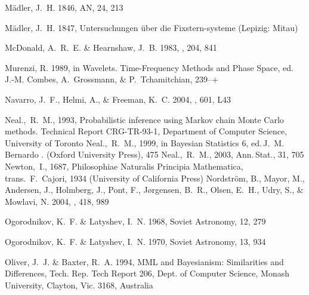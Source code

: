 \begin{thebibliography}{99}
{M{\"a}dler}, J.~H. 1846, AN, 24, 213

{M{\"a}dler}, J.~H. 1847, {Untersuchungen {\"u}ber die Fixstern-systeme}
  (Lepizig: Mitau)

{McDonald}, A.~R.~E. \& {Hearnshaw}, J.~B. 1983, \mnras, 204, 841

{Murenzi}, R. 1989, in Wavelets. Time-Frequency Methods and Phase Space, ed.
  J.-M. {Combes}, A.~{Grossmann}, \& P.~{Tchamitchian}, 239--+

{Navarro}, J.~F., {Helmi}, A., \& {Freeman}, K.~C. 2004, \apjl, 601, L43

  Neal.,~R.~M., 1993,
  Probabilistic inference using {M}arkov chain {M}onte {C}arlo methods.
  Technical Report CRG-TR-93-1, Department of Computer Science,
  University of Toronto
  Neal.,~R.~M., 1999,
  in Bayesian Statistics 6,
  ed.\,J.~M. Bernardo \etal. (Oxford University Press), 475
  Neal.,~R.~M., 2003,
  Ann.\,Stat., 31, 705
  Newton,~I., 1687,
  Philosophiae Naturalis Principia Mathematica,
  trans.\ F.~Cajori, 1934
  (University of California Press)
{Nordstr{\"o}m}, B., {Mayor}, M., {Andersen}, J., {Holmberg}, J., {Pont}, F.,
  {J{\o}rgensen}, B.~R., {Olsen}, E.~H., {Udry}, S., \& {Mowlavi}, N. 2004,
  \aap, 418, 989

{Ogorodnikov}, K.~F. \& {Latyshev}, I.~N. 1968, Soviet Astronomy, 12, 279

{Ogorodnikov}, K.~F. \& {Latyshev}, I.~N. 1970, Soviet Astronomy, 13, 934

{Oliver}, J.~J. \& {Baxter}, R.~A. 1994, {MML and Bayesianism: Similarities and
  Differences}, Tech. Rep. Tech Report 206, Dept. of Computer Science, Monash
  University, Clayton, Vic. 3168, Australia


\end{thebibliography}

